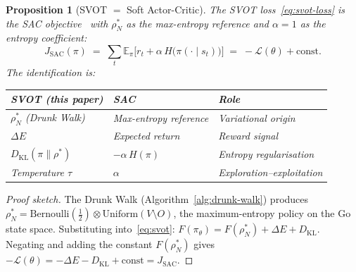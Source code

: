 \documentclass[11pt,a4paper]{article}
\newtheorem{proposition}[theorem]{Proposition}
\newcommand{\cL}{\mathcal{L}}
\newcommand{\DKL}{D_{\mathrm{KL}}}
\begin{document}
\begin{proposition}[SVOT $=$ Soft Actor-Critic]%
\label{prop:svot-sac}
The SVOT loss~\eqref{eq:svot-loss} is the
SAC objective~\cite{Haarnoja2018} with
$\rho^*_N$ as the max-entropy reference and
$\alpha = 1$ as the entropy coefficient:
\[
  J_{\mathrm{SAC}}(\pi)
  \;=\;
  \sum_t \mathbb{E}_{\pi}\bigl[r_t
    + \alpha\, H\!\bigl(\pi(\cdot \mid s_t)\bigr)\bigr]
  \;=\;
  -\cL(\theta) + \mathrm{const}.
\]
The identification is:
\begin{center}
\small
\begin{tabular}{@{}lll@{}}
\toprule
\textbf{SVOT (this paper)} &
\textbf{SAC} &
\textbf{Role} \\
\midrule
$\rho^*_N$ (Drunk Walk) &
  Max-entropy reference &
  Variational origin \\
$\Delta E$ &
  Expected return &
  Reward signal \\
$\DKL(\pi \| \rho^*)$ &
  $-\alpha\, H(\pi)$ &
  Entropy regularisation \\
Temperature $\tau$ &
  $\alpha$ &
  Exploration--exploitation \\
\bottomrule
\end{tabular}
\end{center}
\end{proposition}

\begin{proof}[Proof sketch]
The Drunk Walk
(Algorithm~\ref{alg:drunk-walk})
produces $\rho^*_N =
\mathrm{Bernoulli}(\tfrac{1}{2})
\otimes \mathrm{Uniform}(V \setminus O)$,
the maximum-entropy policy on the Go state space.
Substituting into~\eqref{eq:svot}:
$F(\pi_\theta) = F(\rho^*_N) + \Delta E + \DKL$.
Negating and adding the constant $F(\rho^*_N)$ gives
$-\cL(\theta) = -\Delta E - \DKL + \mathrm{const}
= J_{\mathrm{SAC}}$.
\end{proof}
\end{document}
